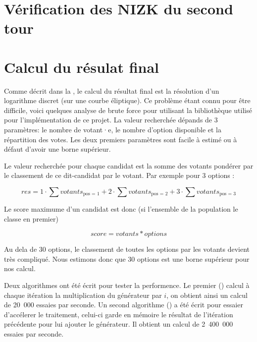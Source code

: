 \documentclass[../report]{subfiles}
\begin{document}
\section{Vérification des NIZK du second tour}

\section{Calcul du résulat final}\label{sec:res:perf:resultat}

Comme décrit dans la , le calcul du résultat final est la résolution d'un logarithme discret (sur une courbe éliptique).
Ce problème étant connu pour être difficile, voici quelques analyse de brute force pour utilisant la bibliothèque utilisé
pour l'implémentation de ce projet.
La valeur recherchée dépands de 3 paramètres: le nombre de votant·e, le nombre d'option disponible et la répartition des votes.
Les deux premiers paramètres sont facile à estimé ou à défaut d'avoir une borne supérieur.

Le valeur recherchée pour chaque candidat est la somme des votants pondérer par le classement de ce dit-candidat par le votant.
Par exemple pour 3 options :

\[
  res = 1 \cdot \sum votants_{\text{pos = 1}}
      + 2 \cdot \sum votants_{\text{pos = 2}}
      + 3 \cdot \sum votants_{\text{pos = 3}}
\]

Le score maximume d'un candidat est donc (si l'ensemble de la population le classe en premier)

\[
  score = votants * options 
\]

Au dela de 30 options, le classement de toutes les options par les votants devient très compliqué.
Nous estimons donc que 30 options est une borne supérieur pour nos calcul.

Deux algorithmes ont été écrit pour tester la performence.
Le premier () calcul à chaque itération la multiplication du générateur 
par $i$, on obtient ainsi un calcul de 20~000 essaies par seconde.
Un second algorithme () a été écrit pour essaier d'accélerer le 
traitement, celui-ci garde en mémoire le résultat de l'itération précédente pour lui ajouter le générateur.
Il obtient un calcul de 2~400~000 essaies par seconde.
\end{document}
